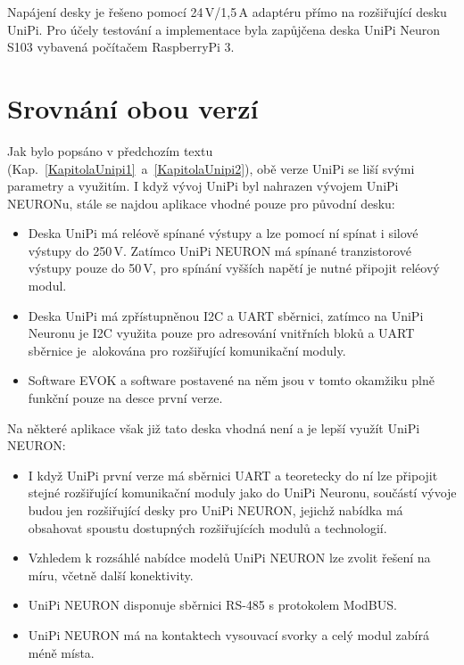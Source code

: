 Napájení desky je řešeno pomocí 24\,V/1,5\,A adaptéru přímo na rozšiřující desku UniPi. Pro účely testování a implementace byla zapůjčena deska UniPi Neuron S103 vybavená počítačem RaspberryPi 3.



\section{Srovnání obou verzí}

Jak bylo popsáno v předchozím textu (Kap.~\ref{KapitolaUnipi1}~a~\ref{KapitolaUnipi2}), obě verze UniPi se liší svými parametry a využitím. I když vývoj UniPi byl nahrazen vývojem UniPi NEURONu, stále se najdou aplikace vhodné pouze pro původní desku:


\begin{itemize}
	\item Deska UniPi má reléově spínané výstupy a lze pomocí ní spínat i silové výstupy do 250\,V. Zatímco UniPi NEURON má spínané tranzistorové výstupy pouze do 50\,V, pro spínání vyšších napětí je nutné připojit reléový modul.
	\item Deska UniPi má zpřístupněnou I2C a UART sběrnici, zatímco na UniPi Neuronu je I2C využita pouze pro adresování vnitřních bloků a UART sběrnice je~alokována pro rozšiřující komunikační moduly.
	\item Software EVOK a software postavené na něm jsou v tomto okamžiku plně funkční pouze na desce první verze.	
\end{itemize}

\vspace{10pt}
Na některé aplikace však již tato deska vhodná není a je lepší využít UniPi NEURON:

\begin{itemize}
	\item I když UniPi první verze má sběrnici UART a teoretecky do ní lze připojit stejné rozšiřující komunikační moduly jako do UniPi Neuronu, součástí vývoje budou jen rozšiřující desky pro UniPi NEURON, jejichž nabídka má obsahovat spoustu dostupných rozšiřujících modulů a technologií.
	\item Vzhledem k rozsáhlé nabídce modelů UniPi NEURON lze zvolit řešení na míru, včetně další konektivity.
	\item UniPi NEURON disponuje sběrnici RS-485 s protokolem ModBUS.
	\item UniPi NEURON má na kontaktech vysouvací svorky a celý modul zabírá méně místa.	
\end{itemize}

